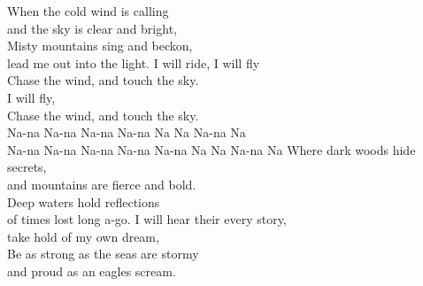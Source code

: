 
\ve
When the cold wind is calling\\
and the sky is clear and bright,\\
Misty mountains sing and beckon,\\
lead me out into the light.
\cho
I will ride, I will fly\\
Chase the wind, and touch the sky.\\
I will fly, \\
Chase the wind, and touch the sky.\\
Na-na   Na-na Na-na Na-na   Na Na   Na-na Na\\
Na-na   Na-na   Na-na Na-na Na-na   Na Na   Na-na Na
\ve
Where dark woods hide secrets,\\
and mountains are fierce and bold.\\
Deep waters hold reflections\\
of times lost long a-go.
\ve
I will hear their every story,\\
take hold of my own dream,\\
Be as strong as the seas are stormy\\
and proud as an eagles scream.

\esong